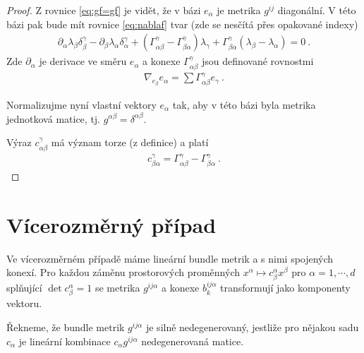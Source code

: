 \begin{proof}
    Z rovnice \eqref{eq:gf=gf} je vidět, že v bázi $e_\alpha$ je metrika $g^{ij}$ diagonální. 
    V této bázi pak bude mít rovnice \eqref{eq:nablaf} tvar (zde se nesčítá přes opakované indexy)
    \begin{align}
        \partial_\alpha \lambda_\beta \delta_\beta^\gamma - \partial_\beta \lambda_\alpha \delta_\alpha^\gamma + (\Gamma_{\alpha \beta}^\gamma - \Gamma_{\beta \alpha}^\gamma ) \lambda_\gamma + \Gamma_{\beta \alpha}^\gamma (\lambda_\beta - \lambda_\alpha) = 0 \:.
    \end{align}
    Zde $\partial_\alpha$ je derivace ve směru $e_\alpha$ a konexe $\Gamma_{\alpha \beta}^\gamma$ jsou definované rovnostmi
    \begin{align}
        \nabla_{e_\beta} e_\alpha = \sum \Gamma^\gamma_{\alpha \beta} e_\gamma \:.
    \end{align}

    Normalizujme nyní vlastní vektory $e_\alpha$ tak, aby v této bázi byla metrika jednotková matice, tj. $g^{\alpha \beta} = \delta^{\alpha \beta}$.

    Výraz $c^\gamma_{\alpha \beta}$ má význam torze (z definice) a platí
    \begin{align}
        c^\gamma_{\beta \alpha} = \Gamma^\gamma_{\alpha \beta} - \Gamma^\gamma_{\beta \alpha} \:.
    \end{align} 

\end{proof}


\section{Vícerozměrný případ}

Ve vícerozměrném případě máme lineární bundle metrik a s nimi spojených konexí. Pro každou záměnu prostorových proměnných $x^\alpha \mapsto c^\alpha_\beta x^\beta$ pro $\alpha = 1, \cdots, d$ splňující $\det c^\alpha_\beta = 1$ se metrika $g^{ij \alpha}$ a konexe $b^{ij \alpha}_k$ transformují jako komponenty vektoru.

\begin{definition}
    Řekneme, že bundle metrik $g^{ij \alpha}$ je silně nedegenerovaný, jestliže pro nějakou sadu $c_\alpha$ je lineární kombinace $c_\alpha g^{ij \alpha}$ nedegenerovaná matice.
\end{definition}

